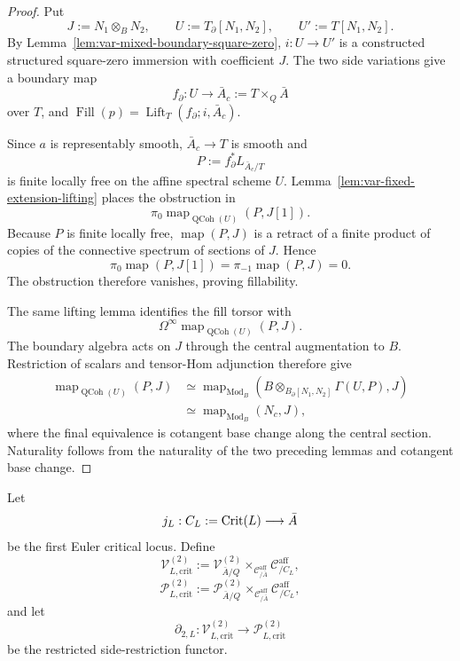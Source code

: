 \begin{proof}
Put
\[
    J:=N_1\otimes_BN_2,
    \qquad
    U:=T_{\partial}[N_1,N_2],
    \qquad
    U':=T[N_1,N_2].
\]
By Lemma~\ref{lem:var-mixed-boundary-square-zero}, \(i:U\to U'\) is a constructed structured square-zero immersion with coefficient \(J\).  The two side variations give a boundary map
\[
    f_{\partial}:U\longrightarrow\bar A_c:=T\times_Q\bar A
\]
over \(T\), and \(\operatorname{Fill}(p)=\operatorname{Lift}_T(f_{\partial};i,\bar A_c)\).

Since \(a\) is representably smooth, \(\bar A_c\to T\) is smooth and
\[
    P:=f_{\partial}^*L_{\bar A_c/T}
\]
is finite locally free on the affine spectral scheme \(U\).  Lemma~\ref{lem:var-fixed-extension-lifting} places the obstruction in
\[
    \pi_0
    \operatorname{map}_{\operatorname{QCoh}(U)}(P,J[1]).
\]
Because \(P\) is finite locally free, \(\operatorname{map}(P,J)\) is a retract of a finite product of copies of the connective spectrum of sections of \(J\).  Hence
\[
    \pi_0\operatorname{map}(P,J[1])
    =
    \pi_{-1}\operatorname{map}(P,J)
    =0.
\]
The obstruction therefore vanishes, proving fillability.

The same lifting lemma identifies the fill torsor with
\[
    \Omega^\infty
    \operatorname{map}_{\operatorname{QCoh}(U)}(P,J).
\]
The boundary algebra acts on \(J\) through the central augmentation to \(B\).  Restriction of scalars and tensor-Hom adjunction therefore give
\[
\begin{aligned}
    \operatorname{map}_{\operatorname{QCoh}(U)}(P,J)
    &\simeq
    \operatorname{map}_{\operatorname{Mod}_B}
    \left(
      B\otimes_{B_{\partial}[N_1,N_2]}\Gamma(U,P),
      J
    \right)\\
    &\simeq
    \operatorname{map}_{\operatorname{Mod}_B}(N_c,J),
\end{aligned}
\]
where the final equivalence is cotangent base change along the central section.  Naturality follows from the naturality of the two preceding lemmas and cotangent base change.
\end{proof}

\begin{definition}
\label{def:var-critical-side-categories}
Let
\[
    j_L:C_L:=\operatorname{Crit}(L)\longrightarrow\bar A
\]
be the first Euler critical locus.  Define
\[
    \mathcal V^{(2)}_{L,\mathrm{crit}}
    :=
    \mathcal V^{(2)}_{\bar A/Q}
    \times_{\mathcal C^{\mathrm{aff}}_{/\bar A}}
    \mathcal C^{\mathrm{aff}}_{/C_L},
\]
\[
    \mathcal P^{(2)}_{L,\mathrm{crit}}
    :=
    \mathcal P^{(2)}_{\bar A/Q}
    \times_{\mathcal C^{\mathrm{aff}}_{/\bar A}}
    \mathcal C^{\mathrm{aff}}_{/C_L},
\]
and let
\[
    \partial_{2,L}:
    \mathcal V^{(2)}_{L,\mathrm{crit}}
    \longrightarrow
    \mathcal P^{(2)}_{L,\mathrm{crit}}
\]
be the restricted side-restriction functor.
\end{definition}

